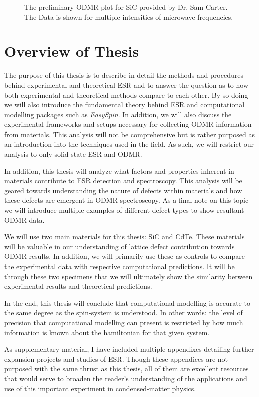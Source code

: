 \documentclass[oneside, astronomy, noacknowlegments]{BYUPhys}
\begin{document}
\begin{figure}
    \caption[Preliminary ODMR data]{\label{fig:PrelimODMR}
     The preliminary ODMR plot for SiC provided by Dr. Sam Carter. The Data is shown for multiple intensities of microwave frequencies.}
\end{figure}

\section{Overview of Thesis}

The purpose of this thesis is to describe in detail the methods and procedures behind experimental and theoretical ESR and to answer the question as to how both experimental and theoretical methods compare to each other. By so doing we will also introduce the fundamental theory behind ESR and computational modelling packages such as \textit{EasySpin}. In addition, we will also discuss the experimental frameworks and setups necessary for collecting ODMR information from materials. This analysis will not be comprehensive but is rather purposed as an introduction into the techniques used in the field. As such, we will restrict our analysis to only solid-state ESR and ODMR.

In addition, this thesis will analyze what factors and properties inherent in materials contribute to ESR detection and spectroscopy. This analysis will be geared towards understanding the nature of defects within materials and how these defects are emergent in ODMR spectroscopy. As a final note on this topic we will introduce multiple examples of different defect-types to show resultant ODMR data.

We will use two main materials for this thesis: SiC and CdTe. These materials will be valuable in our understanding of lattice defect contribution towards ODMR results. In addition, we will primarily use these as controls to compare the experimental data with respective computational predictions. It will be through these two specimens that we will ultimately show the similarity between experimental results and theoretical predictions.

In the end, this thesis will conclude that computational modelling is accurate to the same degree as the spin-system is understood. In other words: the level of precision that computational modelling can present is restricted by how much information is known about the hamiltonian for that given system.

As supplementary material, I have included multiple appendixes detailing further expansion projects and studies of ESR. Though these appendices are not purposed with the same thrust as this thesis, all of them are excellent resources that would serve to broaden the reader's understanding of the applications and use of this important experiment in condensed-matter physics.
\end{document}
